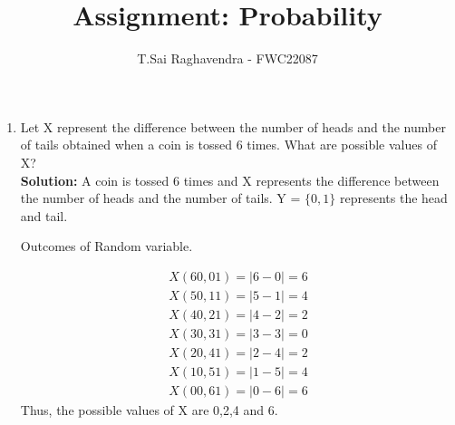 \documentclass{article}
\newcommand{\solution}{\noindent \textbf{Solution: }}
\begin{document}
\title{Assignment: Probability}
\author{\Large T.Sai Raghavendra - FWC22087}
\date{}


\maketitle
\begin{enumerate}[label=13.\arabic{enumi}.\arabic{enumii}]%
\setcounter{enumi}{3}
\setcounter{enumii}{3}

\item Let X represent the difference between the number of heads and the number of tails obtained when a coin is tossed 6 times. What are possible values of X?\\

\solution
A coin is tossed 6 times and X represents the difference between the number of heads and the number of tails.
Y = $\{0,1\}$ represents the head and tail.\\

	\begin{table}[h]
	
	\caption{Outcomes of Random variable.}
	\label{tables:table1}
	\end{table}
	
\begin{align}
X(60,01) = |6-0| = 6\\
X(50,11) = |5-1| = 4\\
X(40,21) = |4-2| = 2\\
X(30,31) = |3-3| = 0\\
X(20,41) = |2-4| = 2\\
X(10,51) = |1-5| = 4\\
X(00,61) = |0-6| = 6
\end{align}
Thus, the possible values of X are 0,2,4 and 6.
\end{enumerate}
\end{document}

